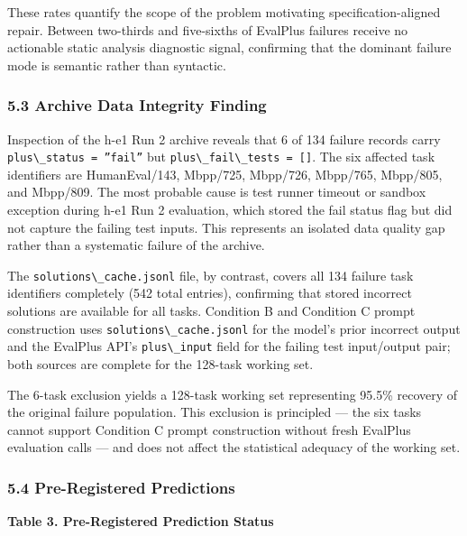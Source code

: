 These rates quantify the scope of the problem motivating specification-aligned repair. Between two-thirds and five-sixths of EvalPlus failures receive no actionable static analysis diagnostic signal, confirming that the dominant failure mode is semantic rather than syntactic.

\subsubsection{5.3 Archive Data Integrity Finding}

Inspection of the h-e1 Run 2 archive reveals that 6 of 134 failure records carry \texttt{plus\textbackslash \_status = ''fail''} but \texttt{plus\textbackslash \_fail\textbackslash \_tests = []}. The six affected task identifiers are HumanEval/143, Mbpp/725, Mbpp/726, Mbpp/765, Mbpp/805, and Mbpp/809. The most probable cause is test runner timeout or sandbox exception during h-e1 Run 2 evaluation, which stored the fail status flag but did not capture the failing test inputs. This represents an isolated data quality gap rather than a systematic failure of the archive.

The \texttt{solutions\textbackslash \_cache.jsonl} file, by contrast, covers all 134 failure task identifiers completely (542 total entries), confirming that stored incorrect solutions are available for all tasks. Condition B and Condition C prompt construction uses \texttt{solutions\textbackslash \_cache.jsonl} for the model's prior incorrect output and the EvalPlus API's \texttt{plus\textbackslash \_input} field for the failing test input/output pair; both sources are complete for the 128-task working set.

The 6-task exclusion yields a 128-task working set representing 95.5\% recovery of the original failure population. This exclusion is principled --- the six tasks cannot support Condition C prompt construction without fresh EvalPlus evaluation calls --- and does not affect the statistical adequacy of the working set.

\subsubsection{5.4 Pre-Registered Predictions}

\textbf{Table 3. Pre-Registered Prediction Status}

